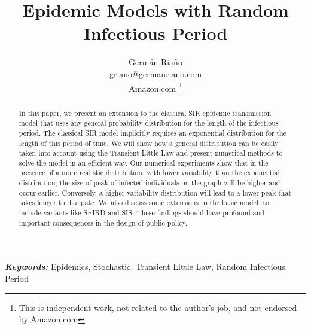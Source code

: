 \documentclass[USenglish,10pt]{article}
\providecommand{\keywords}[1]{\textbf{\textit{Keywords: }} #1}
\begin{document}



\title{Epidemic Models with Random Infectious Period}
\author{Germ\'an Ria\~no \\
    \href{mailto:griano@germanriano.com}{griano@germanriano.com} \\
    Amazon.com \footnote{This is independent work, not related to the author's job, and not endorsed by Amazon.com}}

\maketitle


\begin{abstract}
In this paper, we present an extension to the classical SIR epidemic transmission model that uses any general probability distribution for the length of the infectious period. The classical SIR model implicitly requires an exponential distribution for the length of this period of time. We will show how a general distribution can be easily taken into account using the Transient Little Law and present numerical methods to solve the model in an efficient way. Our numerical experiments show that in the presence of a more realistic distribution, with lower variability than the exponential distribution, the size of peak of infected individuals on the graph will be higher and occur earlier. Conversely, a higher-variability distribution will lead to a lower peak that takes longer to dissipate. We also discuss some extensions to the basic model, to include variants like SEIRD and SIS. These findings should have profound and important consequences in the design of public policy.
\end{abstract}

\keywords{Epidemics, Stochastic, Transient Little Law, Random Infectious Period}
\pagestyle{plain} %






\end{document}
